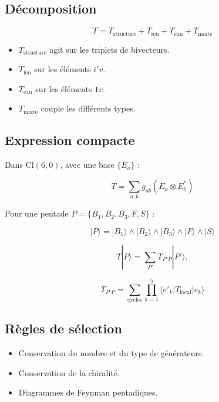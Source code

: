 \documentclass[11pt]{article}
\providecommand{\tightlist}{%
\setlength{\itemsep}{2pt}\setlength{\parskip}{6pt}
}
\begin{document}
\hypertarget{duxe9composition}{%
\subsection{Décomposition}\label{duxe9composition}}

\[
T = T_{\text{structure}} + T_{\text{feu}} + T_{\text{eau}} + T_{\text{mixte}}
\]

\begin{itemize}
\tightlist
\item
  \(T_{\text{structure}}\) agit sur les triplets de bivecteurs.
\item
  \(T_{\text{feu}}\) sur les éléments \(i'v\).
\item
  \(T_{\text{eau}}\) sur les éléments \(1v\).
\item
  \(T_{\text{mixte}}\) couple les différents types.
\end{itemize}

\hypertarget{expression-compacte}{%
\subsection{Expression compacte}\label{expression-compacte}}

Dans \(\text{Cl}(6,0)\), avec une base \(\{E_a\}\) :

\[
T = \sum_{a,b} g_{ab} (E_a \otimes E_b^*)
\]

Pour une pentade \(P = \{B_1,B_2,B_3,F,S\}\) :

\[
|P\rangle = |B_1\rangle \wedge |B_2\rangle \wedge |B_3\rangle \wedge |F\rangle \wedge |S\rangle
\]

\[
T|P\rangle = \sum_{P'} T_{P'P} |P'\rangle,
\]

\[
T_{P'P} = \sum_{\text{cycles}} \prod_{k=1}^5 \langle e'_k | T_{\text{local}} | e_k \rangle
\]

\hypertarget{ruxe8gles-de-suxe9lection}{%
\subsection{Règles de sélection}\label{ruxe8gles-de-suxe9lection}}

\begin{itemize}
\tightlist
\item
  Conservation du nombre et du type de générateurs.
\item
  Conservation de la chiralité.
\item
  Diagrammes de Feynman pentadiques.
\end{itemize}
\end{document}

